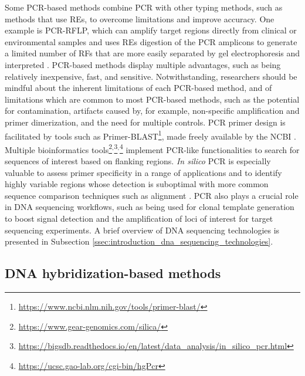 Some \ac{PCR}-based methods combine \ac{PCR} with other typing methods, such as methods that use \acs{RE}s, to overcome limitations and improve accuracy. One example is \ac{PCR}-\ac{RFLP}, which can amplify target regions directly from clinical or environmental samples and uses \acs{RE}s digestion of the \ac{PCR} amplicons to generate a limited number of \acs{RF}s that are more easily separated by gel electrophoresis and interpreted \cite{wichelhaus_rapid_2001}.
\ac{PCR}-based methods display multiple advantages, such as being relatively inexpensive, fast, and sensitive. Notwithstanding, researchers should be mindful about the inherent limitations of each \ac{PCR}-based method, and of limitations which are common to most \ac{PCR}-based methods, such as the potential for contamination, artifacts caused by, for example, non-specific amplification and primer dimerization, and the need for multiple controls. \ac{PCR} primer design is facilitated by tools such as Primer-BLAST\footnote{\url{https://www.ncbi.nlm.nih.gov/tools/primer-blast/}}, made freely available by the \ac{NCBI} \cite{ye_primer-blast_2012}. Multiple bioinformatics tools\footnote{\url{https://www.gear-genomics.com/silica/}}$^{,}$\footnote{\url{https://bigsdb.readthedocs.io/en/latest/data_analysis/in_silico_pcr.html}}$^{,}$\footnote{\url{https://ucsc.gao-lab.org/cgi-bin/hgPcr}} implement \ac{PCR}-like functionalities to search for sequences of interest based on flanking regions. \textit{In silico} \ac{PCR} is especially valuable to assess primer specificity in a range of applications and to identify highly variable regions whose detection is suboptimal with more common sequence comparison techniques such as alignment \cite{kalendar_silico_2024}.
\ac{PCR} also plays a crucial role in \ac{DNA} sequencing workflows, such as being used for clonal template generation to boost signal detection and the amplification of loci of interest for target sequencing experiments. A brief overview of \ac{DNA} sequencing technologies is presented in Subsection \ref{ssec:introduction_dna_sequencing_technologies}.

\subsection{DNA hybridization-based methods}

